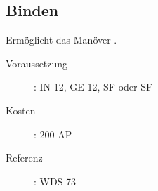 \subsection{Binden}
\label{sf.binden}
Ermöglicht das Manöver .
\begin{description}
    \item[Voraussetzung]:
        IN 12, GE 12, SF  oder SF 
    \item [Kosten]:
        200 AP
    \item [Referenz]:
        WDS 73
\end{description}
